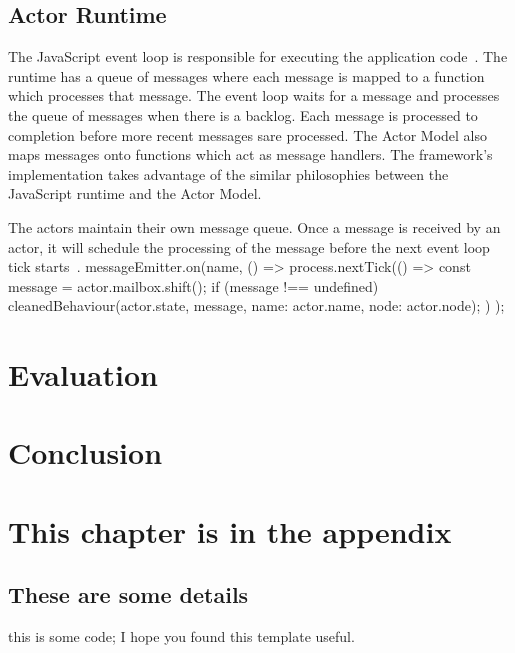 \documentclass[12pt, a4paper]{report}
\newenvironment{code}
{\footnotesize\verbatim}{\endverbatim\normalfont}
\theoremstyle{definition}
\theoremstyle{definition}%
\theoremstyle{definition}%
\theoremstyle{definition}%
\theoremstyle{definition}%
\theoremstyle{definition}%
\begin{document}
\section{Actor Runtime}
The JavaScript event loop is responsible for executing the application code~\cite{eventloopbrowser}. The runtime has a queue of messages where each message is mapped to a function which processes that message. The event loop waits for a message and processes the queue of messages when there is a backlog. Each message is processed to completion before more recent messages sare processed. The Actor Model also maps messages onto functions which act as message handlers. The framework's implementation takes advantage of the similar philosophies between the JavaScript runtime and the Actor Model.

The actors maintain their own message queue. Once a message is received by an actor, it will schedule the processing of the message before the next event loop tick starts~\cite{nexttick}.
\begin{code}
messageEmitter.on(name, () => {
    process.nextTick(() => {
        const message = actor.mailbox.shift();
        if (message !== undefined)
            cleanedBehaviour(actor.state, message, 
            {name: actor.name, node: actor.node});
    })
});
\end{code}
\chapter{Evaluation}

\chapter{Conclusion}

\appendix

\chapter{This chapter is in the appendix}
\section{These are some details}
\begin{code}
this is some code;
I hope you found this template useful.
\end{code}


\bibliomatter





 
\end{document}
